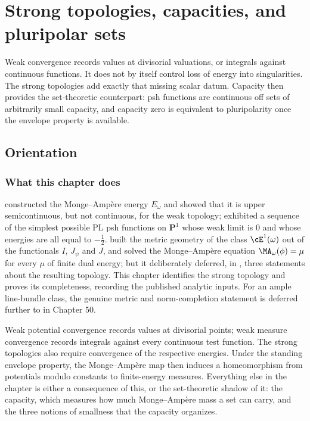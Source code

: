 \chapter{Strong topologies, capacities, and pluripolar sets}
\label{chap:bj-strong-topologies}

Weak convergence records values at divisorial valuations, or integrals
against continuous functions.  It does not by itself control loss of energy
into singularities.  The strong topologies add exactly that missing scalar
datum.  Capacity then provides the set-theoretic counterpart: psh functions
are continuous off sets of arbitrarily small capacity, and capacity zero is
equivalent to pluripolarity once the envelope property is available.

\section{Orientation}
\label{sec:ch48-orientation}

\subsection{What this chapter does}
\label{sec:ch48-what}

 constructed the Monge--Amp\`ere energy $E_\omega$
and showed that it is upper semicontinuous, but not continuous, for the
weak topology;  exhibited a
sequence of the simplest possible PL psh functions on $\mathbf P^1$ whose
weak limit is $0$ and whose energies are all equal to $-\tfrac12$.
 built the metric geometry of the class
$\cE^1(\omega)$ out of the functionals $I$, $J_\psi$ and $J$, and
solved the Monge--Amp\`ere equation $\MA_\omega(\phi)=\mu$ for every
$\mu$ of finite dual energy; but it deliberately deferred, in
, three statements about the resulting
topology. This chapter identifies the strong topology and proves its
completeness, recording the published analytic inputs. For an ample
line-bundle class, the genuine metric and norm-completion statement is
deferred further to  in Chapter 50.

Weak potential convergence records values at divisorial points; weak
measure convergence records integrals against every continuous test
function. The strong topologies also require convergence of the respective
energies. Under the standing envelope property, the Monge--Amp\`ere map
then induces a homeomorphism from potentials modulo constants to
finite-energy measures.
Everything else in the chapter is either a consequence of this, or the
set-theoretic shadow of it: the capacity, which measures how much
Monge--Amp\`ere mass a set can carry, and the three notions of smallness
that the capacity organizes.

